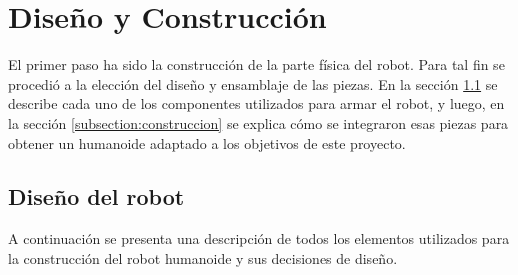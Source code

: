 
\section{Diseño y Construcci\'on}
\label{diseno}
El primer paso ha sido la construcci\'on de la parte física del robot. Para tal fin se procedió a la elección del diseño y ensamblaje de las piezas. En la sección \ref{subsection:diseno} se describe cada uno de los componentes utilizados para armar el robot, y luego, en la secci\'on \ref{subsection:construccion} se explica cómo se integraron esas piezas para obtener un humanoide adaptado a los objetivos de este proyecto.
\subsection{Diseño del robot}
\label{subsection:diseno}
A continuación se presenta una descripción de todos los elementos utilizados para la construcción del robot humanoide y sus decisiones de dise\~no. 


